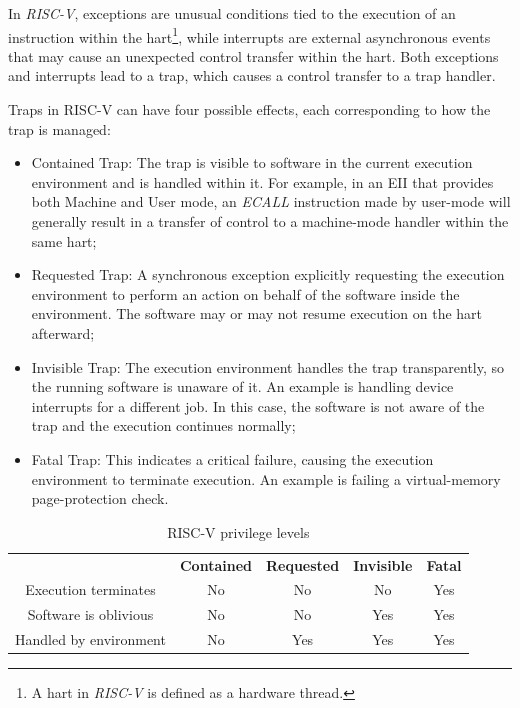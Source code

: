 In \textit{RISC-V}, exceptions are unusual conditions tied to the execution of an
instruction within the hart\footnote{A hart in \textit{RISC-V} is defined as a hardware
thread.}, while interrupts are external asynchronous events that may cause an unexpected
control transfer within the hart. Both exceptions and interrupts lead to a trap,
which causes a control transfer to a trap handler.

Traps in RISC-V can have four possible effects, each corresponding to how the
trap is managed:

\begin{itemize}
  \item Contained Trap: The trap is visible to software in the current execution
    environment and is handled within it. For example, in an EII that provides
    both Machine and User mode, an \textit{ECALL} instruction made by user-mode
    will generally result in a transfer of control to a machine-mode handler
    within the same hart;

  \item Requested Trap: A synchronous exception explicitly requesting the
    execution environment to perform an action on behalf of the software inside
    the environment. The software may or may not resume execution on the hart afterward;

  \item Invisible Trap: The execution environment handles the trap transparently,
    so the running software is unaware of it. An example is handling device
    interrupts for a different job. In this case, the software is not aware of
    the trap and the execution continues normally;

  \item Fatal Trap: This indicates a critical failure, causing the execution environment
    to terminate execution. An example is failing a virtual-memory page-protection
    check.
\end{itemize}

\begin{table}
  \centering
  \begin{tabular}{|c|c|c|c|c|}
    \hline
    \textbf{}                           & \textbf{Contained} & \textbf{Requested} & \textbf{Invisible} & \textbf{Fatal} \\
    \hhline{=====} Execution terminates & No                 & No                 & No                 & Yes            \\
    \hline
    Software is oblivious               & No                 & No                 & Yes                & Yes            \\
    \hline
    Handled by environment              & No                 & Yes                & Yes                & Yes            \\
    \hline
  \end{tabular}
  \caption{RISC-V privilege levels}
  \label{tab:traps}
\end{table}

